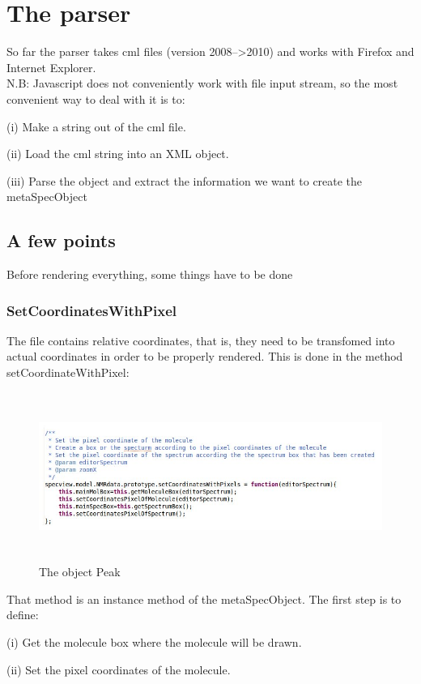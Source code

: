 \section{The parser}

So far the parser takes cml files (version 2008-->2010) and works with Firefox and Internet Explorer.\\
N.B: Javascript does not conveniently work with file input stream, so the most convenient way to deal with it is to:

(i)   Make a string out of the cml file.

(ii)  Load the cml string into an XML object.

(iii) Parse the object and extract the information we want to create the metaSpecObject

\subsection{A few points}
Before rendering everything, some things have to be done
\subsubsection{SetCoordinatesWithPixel}
The file contains relative coordinates, that is, they need to be transfomed into actual coordinates in order to be properly rendered.
This is done in the method setCoordinateWithPixel:
    \begin{figure}[h]
    \begin{centering}
    \caption{The object Peak}
\includegraphics[width=195mm,height=55mm]{./images/setCoordinatesWithPixel}
    \end{centering}
    \end{figure}
That method is an instance method of the metaSpecObject. The first step is to define:

(i) Get the molecule box where the molecule will be drawn.

(ii) Set the pixel coordinates of the molecule.

